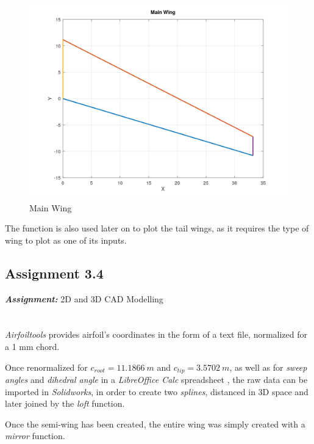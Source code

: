 \documentclass{article}
\begin{document}
\begin{figure}[h!]
    \centering
    \includegraphics[width=\textwidth]{Sources/Plots_and_Pictures/Main_Wing.png}
    \caption{Main Wing}
    \label{Main_wing}
\end{figure}

The function is also used later on to plot the tail wings, as it requires the type of wing to plot as one of its inputs.\\

\clearpage 
\subsection{Assignment 3.4\label{Assignment_3.4}}

\textbf{\textit{Assignment:}} 2D and 3D CAD Modelling \\ \\ \\ 

\textit{Airfoiltools} \autocite{Airfoiltools} provides airfoil's coordinates in the form of a text file, normalized
for a 1 mm chord.

Once renormalized for $c_{root} = 11.1866 \ m$ and $c_{tip} = 3.5702 \ m$, as well as for
 \textit{sweep angles} and \textit{dihedral angle} in a \textit{LibreOffice Calc}
spreadsheet \autocite{libreoffice}, the raw data can 
be imported in \textit{Solidworks}, in order to create two \textit{splines}, distanced in 3D space
and later joined by the \textit{loft} function.

Once the semi-wing has been created, the entire wing was simply created with a \textit{mirror} function.
\end{document}

